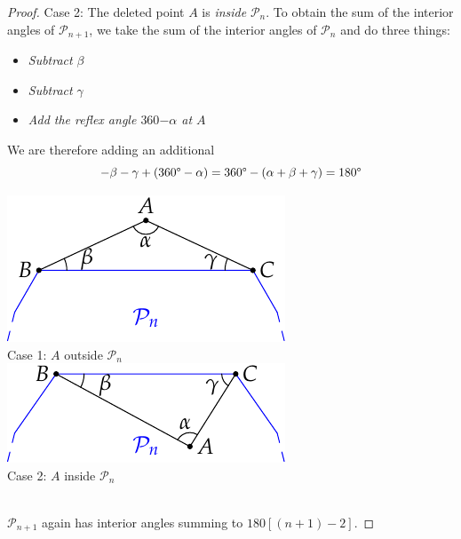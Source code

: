 \begin{proof}
\begin{minipage}[t]{0.64\linewidth}
		Case 2: The deleted point $A$ is \emph{inside} $\mathcal{P}_n$. To obtain the sum of the interior angles of $\mathcal{P}_{n+1}$, we take the sum of the interior angles of $\mathcal{P}_n$ and do three things:
		\begin{itemize}\setlength{\itemsep}{0pt}
	  	\item \emph{Subtract} $\beta$
	  	\item \emph{Subtract} $\gamma$
	  	\item \emph{Add the reflex angle $360$\textdegree$-\alpha$ at $A$}
		\end{itemize}
		We are therefore adding an additional
		\[
			-\beta-\gamma+(360\text{\textdegree}-\alpha)=360\text{\textdegree}-(\alpha+\beta+\gamma)=180\text{\textdegree}
		\]
	\end{minipage}
	\hfill
	\begin{minipage}[t]{0.35\linewidth}\vspace{0pt}
		\includegraphics[width=\textwidth]{induction-05-polygon}\\
		Case 1: $A$ outside $\mathcal{P}_n$\\[25pt]
		\includegraphics[width=\textwidth]{induction-06-polygon}\\
		Case 2: $A$ inside $\mathcal{P}_n$
	\end{minipage}\\[8pt]
	$\mathcal{P}_{n+1}$ again has interior angles summing to $180[(n+1)-2]$\textdegree.
\end{proof}

